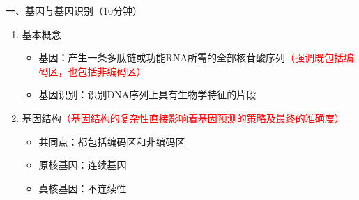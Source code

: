 \documentclass{TIJMUjiaoanSY}
\begin{document}


\firstTail


\newpage
\otherHeader

\noindent
一、基因与基因识别（10分钟）
\begin{enumerate}
  \item 基本概念
  \begin{itemize}
    \item 基因：产生一条多肽链或功能RNA所需的全部核苷酸序列\textcolor{red}{（强调既包括编码区，也包括非编码区）}
    \item 基因识别：识别DNA序列上具有生物学特征的片段
  \end{itemize}
  \item 基因结构\textcolor{red}{（基因结构的复杂性直接影响着基因预测的策略及最终的准确度）}
  \begin{itemize}
    \item 共同点：都包括编码区和非编码区
    \item 原核基因：连续基因
    \item 真核基因：不连续性
  \end{itemize}
\end{enumerate}
\end{document}

